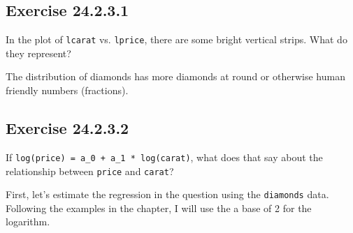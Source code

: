 \documentclass[]{book}
\newenvironment{Shaded}{\begin{snugshade}}{\end{snugshade}}
\newcommand{\DataTypeTok}[1]{\textcolor[rgb]{0.13,0.29,0.53}{#1}}
\newcommand{\FloatTok}[1]{\textcolor[rgb]{0.00,0.00,0.81}{#1}}
\newcommand{\KeywordTok}[1]{\textcolor[rgb]{0.13,0.29,0.53}{\textbf{#1}}}
\newcommand{\NormalTok}[1]{#1}
\newcommand{\OperatorTok}[1]{\textcolor[rgb]{0.81,0.36,0.00}{\textbf{#1}}}
\newcommand{\StringTok}[1]{\textcolor[rgb]{0.31,0.60,0.02}{#1}}
\theoremstyle{plain}
\theoremstyle{remark}
\begin{document}
\begin{Shaded}
\end{Shaded}

\hypertarget{exercise-24.2.3.1}{%
\subsection*{\texorpdfstring{Exercise {24.2.3.1}}{Exercise 24.2.3.1}}\label{exercise-24.2.3.1}}

In the plot of \texttt{lcarat} vs. \texttt{lprice}, there are some bright vertical strips. What do they represent?

The distribution of diamonds has more diamonds at round or otherwise human friendly numbers (fractions).

\hypertarget{exercise-24.2.3.2}{%
\subsection*{\texorpdfstring{Exercise {24.2.3.2}}{Exercise 24.2.3.2}}\label{exercise-24.2.3.2}}

If \texttt{log(price)\ =\ a\_0\ +\ a\_1\ *\ log(carat)}, what does that say about the relationship between \texttt{price} and \texttt{carat}?

First, let's estimate the regression in the question using the \texttt{diamonds} data.
Following the examples in the chapter, I will use the a base of 2 for the logarithm.
\end{document}
